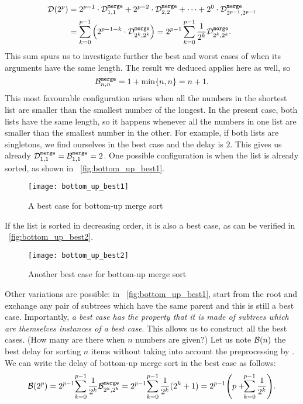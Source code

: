 \begin{align}
\Dideal(2^p)
  &= 2^{p-1} \cdot \comp{merge}{1,1} + 2^{p-2} \cdot
     \comp{merge}{2,2} + \dots + 2^0 \cdot
     \comp{merge}{2^{p-1},2^{p-1}}\notag\\
  &= \sum_{k=0}^{p-1}{\left(2^{p-1-k} \cdot \comp{merge}{2^k,2^k}\right)}
   = 2^{p-1}
   \sum_{k=0}^{p-1}{\frac{1}{2^k}\comp{merge}{2^k,2^k}}.
\label{eq:delay_power_2}
\end{align}
This sum spurs us to investigate further the best and worst cases of
 when its arguments have the same length. The result
we deduced  applies here as well, so
\[
\best{merge}{n,n} = 1 + \min\{n,n\} = n + 1.
\]
This most favourable configuration arises when all the numbers in the
shortest list are smaller than the smallest number of the longest. In
the present case, both lists have the same length, so it happens
whenever all the numbers in one list are smaller than the smallest
number in the other. For example, if both lists are singletons, we
find ourselves in the best case and the delay is \(2\). This gives us
already \(\comp{merge}{1,1} = \best{merge}{1,1} = 2\). One possible
configuration is when the list is already sorted, as shown in
\fig~\vref{fig:bottom_up_best1}.
\begin{figure}[t]
\centering
\texttt{[image: bottom\_up\_best1]}
\caption{A best case for bottom\hyp{}up merge sort
\label{fig:bottom_up_best1}}
\end{figure}
If the list is sorted in decreasing order, it is also a best case, as
can be verified in \fig~\vref{fig:bottom_up_best2}.
\begin{figure}[b]
\centering
\texttt{[image: bottom\_up\_best2]}
\caption{Another best case for bottom\hyp{}up merge sort
\label{fig:bottom_up_best2}}
\end{figure}
Other variations are possible: in \fig~\vref{fig:bottom_up_best1},
start from the root and exchange any pair of subtrees which have the
same parent and this is still a best case. Importantly, \emph{a best
  case has the property that it is made of subtrees which are
  themselves instances of a best case}. This allows us to construct
all the best cases. (How many are there when \(n\) numbers are given?)
Let us note \(\Bideal(n)\) the best delay for sorting \(n\) items
without taking into account the preprocessing by .  We
can write the delay of bottom\hyp{}up merge sort in the best case as
follows:
\[
\Bideal(2^p)
  = 2^{p-1}\!\sum_{k=0}^{p-1}{\frac{1}{2^k}\best{merge}{2^k,2^k}}
   = 2^{p-1}\!\sum_{k=0}^{p-1}{\frac{1}{2^k}(2^k+1)}\\
  = 2^{p-1} \!\left(p +\!\!\sum_{k=0}^{p-1}{\frac{1}{2^k}}\right)\!.
\]
